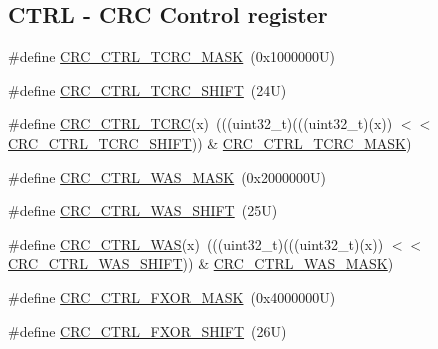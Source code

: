 \subsection*{C\+T\+RL -\/ C\+RC Control register}
\begin{DoxyCompactItemize}
\item 
\#define \mbox{\hyperlink{group___c_r_c___register___masks_gad441a2b8f6300b71038d47cc3c8c0fcc}{C\+R\+C\+\_\+\+C\+T\+R\+L\+\_\+\+T\+C\+R\+C\+\_\+\+M\+A\+SK}}~(0x1000000\+U)
\item 
\#define \mbox{\hyperlink{group___c_r_c___register___masks_ga7c3cc17a7bc8f6c0621f3ce91e7b2b3e}{C\+R\+C\+\_\+\+C\+T\+R\+L\+\_\+\+T\+C\+R\+C\+\_\+\+S\+H\+I\+FT}}~(24\+U)
\item 
\#define \mbox{\hyperlink{group___c_r_c___register___masks_gadc93d490efb1ad730e851e6c37c6eb2a}{C\+R\+C\+\_\+\+C\+T\+R\+L\+\_\+\+T\+C\+RC}}(x)~(((uint32\+\_\+t)(((uint32\+\_\+t)(x)) $<$$<$ \mbox{\hyperlink{group___c_r_c___register___masks_ga7c3cc17a7bc8f6c0621f3ce91e7b2b3e}{C\+R\+C\+\_\+\+C\+T\+R\+L\+\_\+\+T\+C\+R\+C\+\_\+\+S\+H\+I\+FT}})) \& \mbox{\hyperlink{group___c_r_c___register___masks_gad441a2b8f6300b71038d47cc3c8c0fcc}{C\+R\+C\+\_\+\+C\+T\+R\+L\+\_\+\+T\+C\+R\+C\+\_\+\+M\+A\+SK}})
\item 
\#define \mbox{\hyperlink{group___c_r_c___register___masks_gaf3955c626d1b33289184fdc8a8a09147}{C\+R\+C\+\_\+\+C\+T\+R\+L\+\_\+\+W\+A\+S\+\_\+\+M\+A\+SK}}~(0x2000000\+U)
\item 
\#define \mbox{\hyperlink{group___c_r_c___register___masks_gaf0d0849f057da668b51b759b7a2ba70f}{C\+R\+C\+\_\+\+C\+T\+R\+L\+\_\+\+W\+A\+S\+\_\+\+S\+H\+I\+FT}}~(25\+U)
\item 
\#define \mbox{\hyperlink{group___c_r_c___register___masks_ga76fe9bbf17366306d191baea060ee291}{C\+R\+C\+\_\+\+C\+T\+R\+L\+\_\+\+W\+AS}}(x)~(((uint32\+\_\+t)(((uint32\+\_\+t)(x)) $<$$<$ \mbox{\hyperlink{group___c_r_c___register___masks_gaf0d0849f057da668b51b759b7a2ba70f}{C\+R\+C\+\_\+\+C\+T\+R\+L\+\_\+\+W\+A\+S\+\_\+\+S\+H\+I\+FT}})) \& \mbox{\hyperlink{group___c_r_c___register___masks_gaf3955c626d1b33289184fdc8a8a09147}{C\+R\+C\+\_\+\+C\+T\+R\+L\+\_\+\+W\+A\+S\+\_\+\+M\+A\+SK}})
\item 
\#define \mbox{\hyperlink{group___c_r_c___register___masks_ga7c59a3459d15bbbf8ae8bbcc208a1b31}{C\+R\+C\+\_\+\+C\+T\+R\+L\+\_\+\+F\+X\+O\+R\+\_\+\+M\+A\+SK}}~(0x4000000\+U)
\item 
\#define \mbox{\hyperlink{group___c_r_c___register___masks_ga99bb491c03e22125b5053167bf361218}{C\+R\+C\+\_\+\+C\+T\+R\+L\+\_\+\+F\+X\+O\+R\+\_\+\+S\+H\+I\+FT}}~(26\+U)

\end{DoxyCompactItemize}
